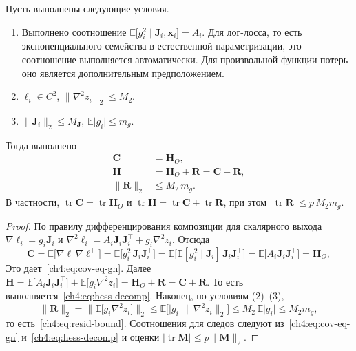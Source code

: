\begin{proposition}\label{ch4:prop:cov-hess}
Пусть выполнены следующие условия.
\begin{enumerate}[1)]
\item Выполнено соотношение $\mathbb{E}\bigl[g_i^2\mid\mathbf{J}_i,\mathbf{x}_i\bigr]=A_i$. Для лог-лосса, то есть экспоненциального семейства в естественной параметризации, это соотношение выполняется автоматически. Для произвольной функции потерь оно является дополнительным предположением.
\item $\ell_i\in C^2$, $\bigl\|\nabla^2z_i\bigr\|_2\le M_2$.
\item $\bigl\|\mathbf{J}_i\bigr\|_2\le M_{\mathbf{J}}$, $\mathbb{E}\lvert g_i\rvert\le m_g$.
\end{enumerate}
Тогда выполнено
\begin{align}
  \mathbf{C}&=\mathbf{H}_O, \label{ch4:eq:cov-eq-gn}\\
  \mathbf{H}&=\mathbf{H}_O+\mathbf{R}=\mathbf{C}+\mathbf{R}, \label{ch4:eq:hess-decomp}\\
  \bigl\|\mathbf{R}\bigr\|_2&\le M_2\,m_g. \label{ch4:eq:resid-bound}
\end{align}
В частности, $\operatorname{tr}\mathbf{C}=\operatorname{tr}\mathbf{H}_O$ и $\operatorname{tr}\mathbf{H}=\operatorname{tr}\mathbf{C}+\operatorname{tr}\mathbf{R}$, при этом $\lvert\operatorname{tr}\mathbf{R}\rvert\le p\,M_2m_g$.
\end{proposition}

\begin{proof}
По правилу дифференцирования композиции для скалярного выхода $\nabla\ell_i=g_i\mathbf{J}_i$ и $\nabla^2\ell_i=A_i\mathbf{J}_i\mathbf{J}_i^{\top}+g_i\nabla^2z_i$. Отсюда
\[
  \mathbf{C}=\mathbb{E}\bigl[\nabla\ell\,\nabla\ell^{\top}\bigr]=\mathbb{E}\bigl[g_i^2\,\mathbf{J}_i\mathbf{J}_i^{\top}\bigr]
  =\mathbb{E}\bigl[\mathbb{E}[g_i^2\mid\mathbf{J}_i]\,\mathbf{J}_i\mathbf{J}_i^{\top}\bigr]
  =\mathbb{E}\bigl[A_i\mathbf{J}_i\mathbf{J}_i^{\top}\bigr]=\mathbf{H}_O ,
\]
Это дает~\eqref{ch4:eq:cov-eq-gn}.
Далее $\mathbf{H}=\mathbb{E}\bigl[A_i\mathbf{J}_i\mathbf{J}_i^{\top}\bigr]+\mathbb{E}\bigl[g_i\nabla^2z_i\bigr]=\mathbf{H}_O+\mathbf{R}=\mathbf{C}+\mathbf{R}$.
То есть выполняется~\eqref{ch4:eq:hess-decomp}.
Наконец, по условиям (2)--(3),
\[
  \bigl\|\mathbf{R}\bigr\|_2=\bigl\|\mathbb{E}\bigl[g_i\nabla^2z_i\bigr]\bigr\|_2\le\mathbb{E}\bigl[\lvert g_i\rvert\,\bigl\|\nabla^2z_i\bigr\|_2\bigr]\le M_2\,\mathbb{E}\lvert g_i\rvert\le M_2m_g ,
\]
то есть~\eqref{ch4:eq:resid-bound}.
Соотношения для следов следуют из~\eqref{ch4:eq:cov-eq-gn} и~\eqref{ch4:eq:hess-decomp} и оценки $\lvert\operatorname{tr}\mathbf{M}\rvert\le p\|\mathbf{M}\|_2$. \end{proof}

